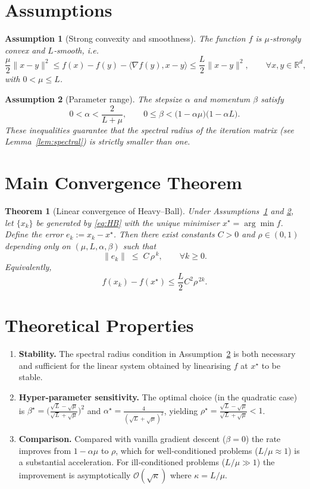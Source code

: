 \documentclass{article}
\newtheorem{theorem}{Theorem}[section]
\newtheorem{assumption}{Assumption}[section]
\begin{document}
\newpage

\section*{Assumptions}
\begin{assumption}[Strong convexity and smoothness]\label{ass:SC}
The function $f$ is $\mu$‑strongly convex and $L$‑smooth, i.e.
\[
\frac{\mu}{2}\|x-y\|^2\le f(x)-f(y)-\langle\nabla f(y),x-y\rangle
\le\frac{L}{2}\|x-y\|^2,\qquad\forall x,y\in\mathbb{R}^d,
\]
with $0<\mu\le L$.
\end{assumption}
\begin{assumption}[Parameter range]\label{ass:param}
The stepsize $\alpha$ and momentum $\beta$ satisfy
\[
0<\alpha<\frac{2}{L+\mu},\qquad
0\le\beta<\bigl(1-\alpha\mu\bigr)\bigl(1-\alpha L\bigr).
\]
These inequalities guarantee that the spectral radius of the iteration matrix (see Lemma~\ref{lem:spectral}) is strictly smaller than one.
\end{assumption}

\section*{Main Convergence Theorem}
\begin{theorem}[Linear convergence of Heavy–Ball]\label{thm:linear}
Under Assumptions~\ref{ass:SC} and \ref{ass:param}, let $\{x_k\}$ be generated by \eqref{eq:HB} with the unique minimiser $x^\star=\arg\min f$. Define the error $e_k:=x_k-x^\star$. Then there exist constants $C>0$ and $\rho\in(0,1)$ depending only on $(\mu,L,\alpha,\beta)$ such that
\[
\|e_k\|\;\le\; C\,\rho^{\,k},\qquad\forall k\ge0 .
\]
Equivalently,
\[
f(x_k)-f(x^\star)\le \frac{L}{2}C^2\rho^{\,2k}.
\]
\end{theorem}

\section*{Theoretical Properties}
\begin{enumerate}[label=\arabic*.]
\item \textbf{Stability.} The spectral radius condition in Assumption~\ref{ass:param} is both necessary and sufficient for the linear system obtained by linearising $f$ at $x^\star$ to be stable.
\item \textbf{Hyper‑parameter sensitivity.} The optimal choice (in the quadratic case) is $\beta^\star=\bigl(\frac{\sqrt{L}-\sqrt{\mu}}{\sqrt{L}+\sqrt{\mu}}\bigr)^2$ and $\alpha^\star=\frac{4}{(\sqrt{L}+\sqrt{\mu})^2}$, yielding $\rho^\star= \frac{\sqrt{L}-\sqrt{\mu}}{\sqrt{L}+\sqrt{\mu}}<1$.
\item \textbf{Comparison.} Compared with vanilla gradient descent ($\beta=0$) the rate improves from $1-\alpha\mu$ to $\rho$, which for well‑conditioned problems ($L/\mu\approx1$) is a substantial acceleration. For ill‑conditioned problems ($L/\mu\gg1$) the improvement is asymptotically $\mathcal O(\sqrt{\kappa})$ where $\kappa=L/\mu$.
\end{enumerate}
\end{document}

